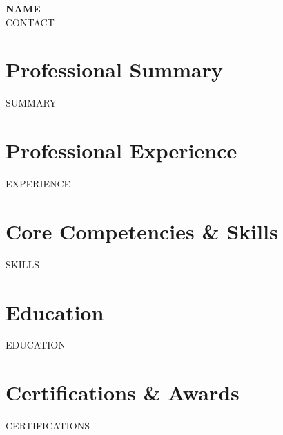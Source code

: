 \documentclass[10pt,a4paper]{article}
\newcommand{\resumeSubHeadingListStart}{\begin{itemize}[leftmargin=0.15in, label={}]}
\newcommand{\resumeSubHeadingListEnd}{\end{itemize}}
\begin{document}
\begin{center}
  \textbf{\Huge {{NAME}}} \\
  \vspace{2pt}
  \small {{CONTACT}}
\end{center}

\section{Professional Summary}
\small{{{SUMMARY}}}

\section{Professional Experience}
\resumeSubHeadingListStart
{{EXPERIENCE}}
\resumeSubHeadingListEnd

\section{Core Competencies \& Skills}
\begin{itemize}[leftmargin=0.15in, label={}]
  \small{\item{
{{SKILLS}}
  }}
\end{itemize}

\section{Education}
\resumeSubHeadingListStart
{{EDUCATION}}
\resumeSubHeadingListEnd

\section{Certifications \& Awards}
\resumeSubHeadingListStart
{{CERTIFICATIONS}}
\resumeSubHeadingListEnd
\end{document}
